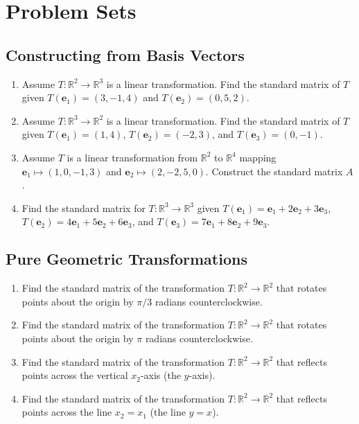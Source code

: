 \documentclass[12pt]{article}
\begin{document}
\clearpage

\section{Problem Sets}

\subsection*{Constructing from Basis Vectors}
\begin{enumerate}
    \item Assume $T: \mathbb{R}^2 \rightarrow \mathbb{R}^3$ is a linear transformation. Find the standard matrix of $T$ given $T(\mathbf{e}_1) = (3, -1, 4)$ and $T(\mathbf{e}_2) = (0, 5, 2)$.
    
    \item Assume $T: \mathbb{R}^3 \rightarrow \mathbb{R}^2$ is a linear transformation. Find the standard matrix of $T$ given $T(\mathbf{e}_1) = (1, 4)$, $T(\mathbf{e}_2) = (-2, 3)$, and $T(\mathbf{e}_3) = (0, -1)$.
    
    \item Assume $T$ is a linear transformation from $\mathbb{R}^2$ to $\mathbb{R}^4$ mapping $\mathbf{e}_1 \mapsto (1, 0, -1, 3)$ and $\mathbf{e}_2 \mapsto (2, -2, 5, 0)$. Construct the standard matrix $A$.
    
    \item Find the standard matrix for $T: \mathbb{R}^3 \rightarrow \mathbb{R}^3$ given $T(\mathbf{e}_1) = \mathbf{e}_1 + 2\mathbf{e}_2 + 3\mathbf{e}_3$, $T(\mathbf{e}_2) = 4\mathbf{e}_1 + 5\mathbf{e}_2 + 6\mathbf{e}_3$, and $T(\mathbf{e}_3) = 7\mathbf{e}_1 + 8\mathbf{e}_2 + 9\mathbf{e}_3$.
\end{enumerate}

\subsection*{Pure Geometric Transformations}
\begin{enumerate}[resume]
    \item Find the standard matrix of the transformation $T: \mathbb{R}^2 \rightarrow \mathbb{R}^2$ that rotates points about the origin by $\pi/3$ radians counterclockwise.
    
    \item Find the standard matrix of the transformation $T: \mathbb{R}^2 \rightarrow \mathbb{R}^2$ that rotates points about the origin by $\pi$ radians counterclockwise.
    
    \item Find the standard matrix of the transformation $T: \mathbb{R}^2 \rightarrow \mathbb{R}^2$ that reflects points across the vertical $x_2$-axis (the $y$-axis).
    
    \item Find the standard matrix of the transformation $T: \mathbb{R}^2 \rightarrow \mathbb{R}^2$ that reflects points across the line $x_2 = x_1$ (the line $y = x$).
\end{enumerate}
\end{document}
